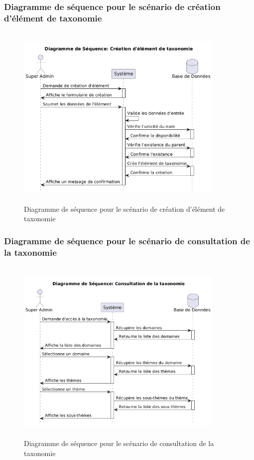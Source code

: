 \subsubsection{Diagramme de séquence pour le scénario de création d'élément de taxonomie}
\begin{figure}[H]
    \centering
    \includegraphics[width=10cm,height=9cm]{images/createtaxonomysq.png}
    \caption{Diagramme de séquence pour le scénario de création d'élément de taxonomie}
\end{figure}

\subsubsection{Diagramme de séquence pour le scénario de consultation de la taxonomie}
\begin{figure}[H]
    \centering
    \includegraphics[width=10cm,height=9cm]{images/consulttaxonomysq.png}
    \caption{Diagramme de séquence pour le scénario de consultation de la taxonomie}
\end{figure}

